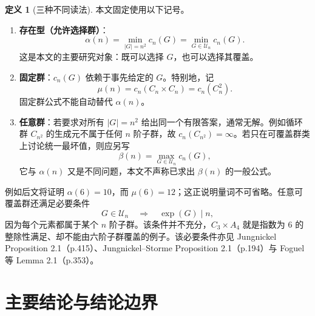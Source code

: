 \documentclass[11pt,a4paper]{article}
\numberwithin{equation}{section}
\theoremstyle{plain}
\theoremstyle{definition}
\newtheorem{definition}[theorem]{定义}
\theoremstyle{remark}
\newcommand{\calU}{\mathcal{U}}
\begin{document}
\begin{definition}[三种不同读法]
本文固定使用以下记号。
\begin{enumerate}[label=\textup{(\arabic*)},leftmargin=2.6em]
  \item \textbf{存在型（允许选择群）}：
  \begin{equation}
   \alpha(n)=\min_{|G|=n^2}c_n(G)=\min_{G\in\calU_n}c_n(G).
  \end{equation}
  这是本文的主要研究对象：既可以选择 $G$，也可以选择其覆盖。
  \item \textbf{固定群}：$c_n(G)$ 依赖于事先给定的 $G$。特别地，记
  \begin{equation}
   \mu(n)=c_n(C_n\times C_n)=c_n(C_n^2).
  \end{equation}
  固定群公式不能自动替代 $\alpha(n)$。
  \item \textbf{任意群}：若要求对所有 $|G|=n^2$ 给出同一个有限答案，通常无解。例如循环群 $C_{n^2}$ 的生成元不属于任何 $n$ 阶子群，故 $c_n(C_{n^2})=\infty$。若只在可覆盖群类上讨论统一最坏值，则应另写
  \begin{equation}
   \beta(n)=\max_{G\in\calU_n}c_n(G),
  \end{equation}
  它与 $\alpha(n)$ 又是不同问题，本文不声称已求出 $\beta(n)$ 的一般公式。
\end{enumerate}
\end{definition}

例如后文将证明 $\alpha(6)=10$，而 $\mu(6)=12$；这正说明量词不可省略。任意可覆盖群还满足必要条件
\begin{equation}\label{eq:exponent}
 G\in\calU_n\quad\Longrightarrow\quad \exp(G)\mid n,
\end{equation}
因为每个元素都属于某个 $n$ 阶子群。该条件并不充分，$C_3\times A_4$ 就是指数为 $6$ 的整除性满足、却不能由六阶子群覆盖的例子。该必要条件亦见 Jungnickel \cite{Jungnickel1999} Proposition 2.1（p.415）、Jungnickel--Storme \cite{JungnickelStorme2001} Proposition 2.1（p.194）与 Foguel 等 \cite{Foguel2025} Lemma 2.1（p.353）。

\section{主要结论与结论边界}
\end{document}
